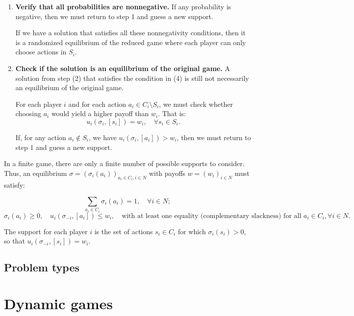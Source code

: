 \documentclass{article}
\begin{document}
\begin{enumerate}
    \item \textbf{Verify that all probabilities are nonnegative.} If any probability is negative, then we must return to step 1 and guess a new support.

    If we have a solution that satisfies all these nonnegativity conditions, then it is a randomized equilibrium of the reduced game where each player can only choose actions in \( S_i \).

    \item \textbf{Check if the solution is an equilibrium of the original game.} A solution from step (2) that satisfies the condition in (4) is still not necessarily an equilibrium of the original game.

    For each player \( i \) and for each action \( a_i \in C_i \setminus S_i \), we must check whether choosing \( a_i \) would yield a higher payoff than \( w_i \). That is:
    \[
    u_i(\sigma_i, [s_i]) = w_i, \quad \forall s_i \in S_i.
    \]

    If, for any action \( a_i \notin S_i \), we have \( u_i(\sigma_i, [a_i]) > w_i \), then we must return to step 1 and guess a new support.

\end{enumerate}

In a finite game, there are only a finite number of possible supports to consider. Thus, an equilibrium \( \sigma = (\sigma_i(a_i))_{a_i \in C_i, i \in N} \) with payoffs \( w = (w_i)_{i \in N} \) must satisfy:

\[
\sum_{a_i \in C_i} \sigma_i(a_i) = 1, \quad \forall i \in N;
\]
\[
\sigma_i(a_i) \geq 0, \quad u_i(\sigma_{-i}, [a_i]) \leq w_i, \quad \text{with at least one equality (complementary slackness) for all } a_i \in C_i, \forall i \in N.
\]

The support for each player \( i \) is the set of actions \( s_i \in C_i \) for which \( \sigma_i(s_i) > 0 \), so that \( u_i(\sigma_{-i}, [s_i]) = w_i \).


\subsection{Problem types}



\section{Dynamic games}\label{DG}
\end{document}
